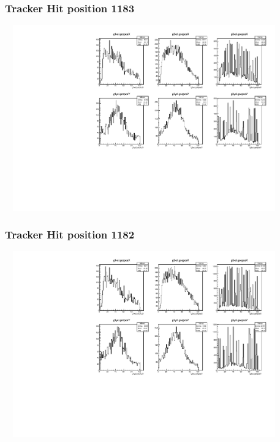\documentclass[slidestop,compress,mathserif]{beamer}
\begin{document}
\begin{frame}\frametitle{Tracker Hit position 1183}
	 \includegraphics[width=12cm,height=8cm]{Tracker_Hit_position_1183.pdf}
\end{frame}
\begin{frame}\frametitle{Tracker Hit position 1182}
	 \includegraphics[width=12cm,height=8cm]{Tracker_Hit_position_1182.pdf}
\end{frame}
\end{document}
